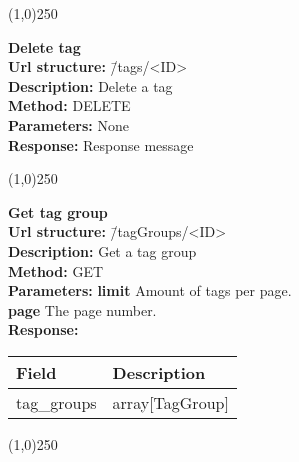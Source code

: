 \documentclass[11pt]{article}
\begin{document}
\begin{center}\line(1,0){250}\end{center}

\begin{tabbing}
\textbf{Delete tag} \\
\textcolor{black!60}{\textbf{Url structure:}} \hspace{0.2in} \= /tags/<ID> \\
\textcolor{black!60}{\textbf{Description:}}  \> Delete a tag \\
\textcolor{black!60}{\textbf{Method:}} \> DELETE \\
\textcolor{black!60}{\textbf{Parameters:}} \> None \\
\textcolor{black!60}{\textbf{Response:}} \> Response message
\end{tabbing}

\begin{center}\line(1,0){250}\end{center}

\begin{tabbing}
\textbf{Get tag group} \\
\textcolor{black!60}{\textbf{Url structure:}} \hspace{0.2in} \= /tagGroups/<ID> \\
\textcolor{black!60}{\textbf{Description:}}  \> Get a tag group \\
\textcolor{black!60}{\textbf{Method:}} \> GET \\
\textcolor{black!60}{\textbf{Parameters:}} \> \textbf{limit} Amount of tags per page. \\
\> \textbf{page} The page number. \\
\textcolor{black!60}{\textbf{Response:}} \\ \>
\begin{tabular}{|l|l|}
\hline
 Field                    &  Description      \\
\hline
 tag\_groups  &  array[TagGroup]  \\
\hline
\end{tabular}
\end{tabbing}

\begin{center}\line(1,0){250}\end{center}
\end{document}
